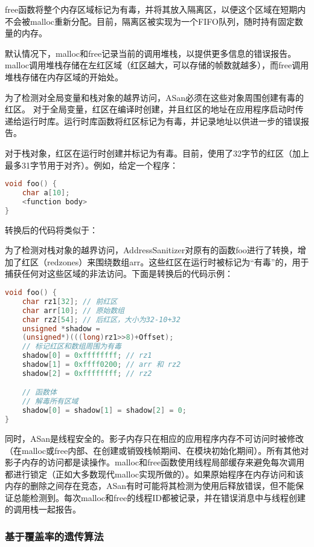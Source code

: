 free函数将整个内存区域标记为有毒，并将其放入隔离区，以便这个区域在短期内不会被malloc重新分配。目前，隔离区被实现为一个FIFO队列，随时持有固定数量的内存。

默认情况下，malloc和free记录当前的调用堆栈，以提供更多信息的错误报告。malloc调用堆栈存储在左红区域（红区越大，可以存储的帧数就越多），而free调用堆栈存储在内存区域的开始处。

为了检测对全局变量和栈对象的越界访问，ASan必须在这些对象周围创建有毒的红区。
对于全局变量，红区在编译时创建，并且红区的地址在应用程序启动时传递给运行时库。运行时库函数将红区标记为有毒，并记录地址以供进一步的错误报告。

对于栈对象，红区在运行时创建并标记为有毒。目前，使用了32字节的红区（加上最多31字节用于对齐）。例如，给定一个程序：

\begin{lstlisting}[language=C++]
void foo() {
	char a[10];
	<function body>
}
\end{lstlisting}

转换后的代码将类似于：

为了检测对栈对象的越界访问，AddressSanitizer对原有的函数foo进行了转换，增加了红区（redzones）来围绕数组arr。这些红区在运行时被标记为“有毒”的，用于捕获任何对这些区域的非法访问。下面是转换后的代码示例：

\begin{lstlisting}[language=C++]
void foo() {
	char rz1[32]; // 前红区
	char arr[10]; // 原始数组
	char rz2[54]; // 后红区，大小为32-10+32
	unsigned *shadow =
	(unsigned*)(((long)rz1>>8)+Offset);
	// 标记红区和数组周围为有毒
	shadow[0] = 0xffffffff; // rz1
	shadow[1] = 0xffff0200; // arr 和 rz2
	shadow[2] = 0xffffffff; // rz2

	// 函数体
	// 解毒所有区域
	shadow[0] = shadow[1] = shadow[2] = 0;
}
\end{lstlisting}

同时，ASan是线程安全的。影子内存只在相应的应用程序内存不可访问时被修改（在malloc或free内部、在创建或销毁栈帧期间、在模块初始化期间）。所有其他对影子内存的访问都是读操作。malloc和free函数使用线程局部缓存来避免每次调用都进行锁定（正如大多数现代malloc实现所做的）。如果原始程序在内存访问和该内存的删除之间存在竞态，ASan有时可能将其检测为使用后释放错误，但不能保证总能检测到。每次malloc和free的线程ID都被记录，并在错误消息中与线程创建的调用栈一起报告。

\subsubsection{基于覆盖率的遗传算法}


